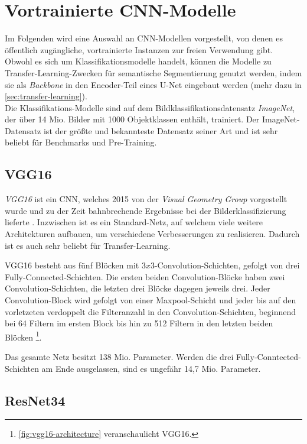 \section{Vortrainierte \ac{CNN}-Modelle} \label{sec:pretrained-backbones}

Im Folgenden wird eine Auswahl an \ac{CNN}-Modellen vorgestellt, von denen es öffentlich zugängliche,
vortrainierte Instanzen zur freien Verwendung gibt. Obwohl es sich um Klassifikationsmodelle handelt,
können die Modelle zu Transfer-Learning-Zwecken für semantische Segmentierung
genutzt werden, indem sie als \textit{Backbone} in den Encoder-Teil eines U-Net eingebaut werden 
(mehr dazu in \autoref{sec:transfer-learning}). \\ 
Die Klassifikations-Modelle sind auf dem Bildklassifikationsdatensatz \textit{ImageNet}, der über 14 Mio. Bilder 
mit 1000 Objektklassen enthält, trainiert. Der ImageNet-Datensatz ist der größte und bekannteste 
Datensatz seiner Art und ist sehr beliebt für Benchmarks und Pre-Training.

\subsection{VGG16} \label{sec:pretrained-backbones:vgg16}

\textit{VGG16} ist ein \ac{CNN}, welches 2015 von der \textit{Visual Geometry Group} vorgestellt wurde 
und zu der Zeit bahnbrechende Ergebnisse bei der Bilderklassifizierung lieferte \cite{Simonyan.04092014}. 
Inzwischen ist es ein Standard-Netz, auf welchem viele weitere Architekturen aufbauen,
um verschiedene Verbesserungen zu realisieren. 
Dadurch ist es auch sehr beliebt für Transfer-Learning. 

VGG16 besteht aus fünf Blöcken mit $3x3$-Convolution-Schichten,
gefolgt von drei Fully-Connected-Schichten. Die ersten beiden Convolution-Blöcke haben zwei Convolution-Schichten,
die letzten drei Blöcke dagegen jeweils drei. 
Jeder Convolution-Block wird gefolgt von einer Maxpool-Schicht und jeder bis auf den vorletzeten verdoppelt die Filteranzahl in den Convolution-Schichten,
beginnend bei 64 Filtern im ersten Block bis hin zu 512 Filtern in den letzten beiden Blöcken \cite{Simonyan.04092014}\footnote{\autoref{fig:vgg16-architecture} veranschaulicht VGG16.}. 

Das gesamte Netz besitzt 138 Mio. Parameter. Werden die drei Fully-Conntected-Schichten am Ende ausgelassen, 
sind es ungefähr 14,7 Mio. Parameter. 

\subsection{ResNet34} \label{sec:pretrained-backbones:resnet}

